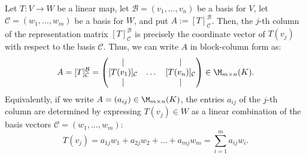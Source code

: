 \begin{proposition*}
\label{prop:columns_of_representation_matrix}
Let $T: V \to W$ be a linear map, let $\mathcal{B} = (v_1, \dots, v_n)$ be a basis for $V$, let $\mathcal{C} = (w_1, \dots, w_m)$ be a basis for $W$, and put $A := [T]_{\mathcal{C}}^{\mathcal{B}}$.
Then, the $j$-th column of the representation matrix $[T]_{\mathcal{C}}^{\mathcal{B}}$ is precisely the coordinate vector of $T(v_j)$ with respect to the basis $\mathcal{C}$. Thus, we can write $A$ in block-column form as:
\[
A = [T]_{\mathcal{C}}^{\mathcal{B}} =
\begin{pmatrix}
| & & | \\
[T(v_1)]_{\mathcal{C}} & \dots & [T(v_n)]_{\mathcal{C}} \\
| & & |
\end{pmatrix}
\in \M_{m \times n}(K).
\]
Equivalently, if we write $A = (a_{ij}) \in \M_{m \times n}(K)$, the entries $a_{ij}$ of the $j$-th column are determined by expressing $T(v_j) \in W$ as a linear combination of the basis vectors $\mathcal{C} = (w_1, \dots, w_m)$:
\[
T(v_j) = a_{1j} w_1 + a_{2j} w_2 + \dots + a_{mj} w_m = \sum_{i=1}^m a_{ij} w_i.
\]
\end{proposition*}

